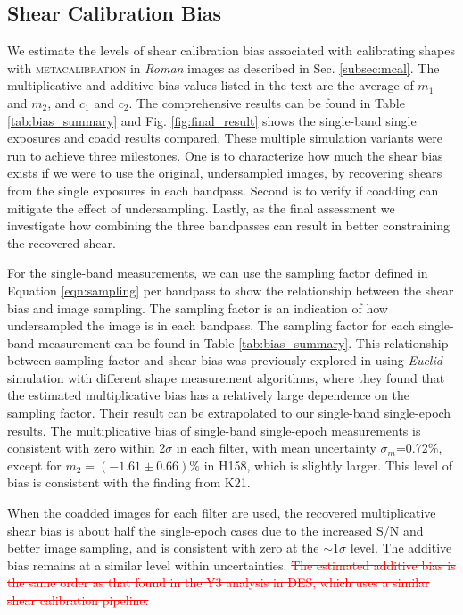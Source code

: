 \documentclass[fleqn,usenatbib]{mnras}
\begin{document}
\subsection{Shear Calibration Bias}
\label{subsec:shapes}
We estimate the levels of shear calibration bias associated with calibrating shapes with \textsc{metacalibration} in \emph{Roman} images as described in Sec. \ref{subsec:mcal}. The multiplicative and additive bias values listed in the text are the average of $m_{1}$ and $m_{2}$, and $c_{1}$ and $c_{2}$. The comprehensive results can be found in Table \ref{tab:bias_summary} and Fig. \ref{fig:final_result} shows the single-band single exposures and coadd results compared. These multiple simulation variants were run to achieve three milestones. One is to characterize how much the shear bias exists if we were to use the original, undersampled images, by recovering shears from the single exposures in each bandpass. Second is to verify if coadding can mitigate the effect of undersampling. Lastly, as the final assessment we investigate how combining the three bandpasses can result in better constraining the recovered shear.


For the single-band measurements, we can use the sampling factor defined in Equation \eqref{eqn:sampling} per bandpass to show the relationship between the shear bias and image sampling. The sampling factor is an indication of how undersampled the image is in each bandpass. The sampling factor for each single-band measurement can be found in Table \ref{tab:bias_summary}. This relationship between sampling factor and shear bias was previously explored in \citealt{2021MNRAS.502.4048K} using \emph{Euclid} simulation with different shape measurement algorithms, where they found that the estimated multiplicative bias has a relatively large dependence on the sampling factor. Their result can be extrapolated to our single-band single-epoch results. The multiplicative bias of single-band single-epoch measurements is consistent with zero within 2$\sigma$ in each filter, with mean uncertainty $\sigma_m$=0.72\%, except for $m_{2}=(-1.61\pm0.66)\%$ in H158, which is slightly larger. This level of bias is consistent with the finding from K21. 


When the coadded images for each filter are used, the recovered multiplicative shear bias is about half the single-epoch cases due to the increased S/N and better image sampling, and is consistent with zero at the $\sim$1$\sigma$ level. The additive bias remains at a similar level within uncertainties. \textcolor{red}{\sout{The estimated additive bias is the same order as that found in the Y3 analysis in DES, which uses a similar shear calibration pipeline.}}
\end{document}
